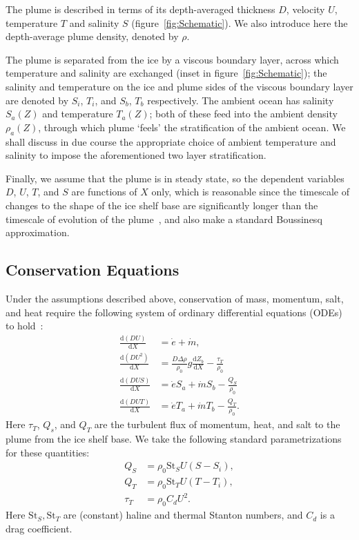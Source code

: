 \documentclass{jfm}
\newcommand{\dd}[2]{\frac{\mathrm{d} #1}{\mathrm{d} #2}}
\begin{document}
The plume is described in terms of its depth-averaged thickness $D$, velocity $U$, temperature $T$ and salinity $S$ (figure~\ref{fig:Schematic}). We also introduce here the depth-average plume density, denoted by $\rho$.

The plume is separated from the ice by a viscous boundary layer, across which temperature and salinity are exchanged (inset in figure~\ref{fig:Schematic}); the salinity and temperature on the ice and plume sides of the viscous boundary layer are denoted by $S_i$, $T_i$, and $S_b$, $T_b$ respectively. The ambient ocean has salinity $S_a(Z)$ and temperature $T_a(Z)$; both of these feed into the ambient density $\rho_a(Z)$, through which plume `feels' the stratification of the ambient ocean.  We shall discuss in due course the appropriate choice of ambient temperature and salinity to impose the aforementioned two layer stratification. 

Finally, we assume that the plume is in steady state, so the dependent variables $D$, $U$, $T$, and $S$ are functions of $X$ only, which is reasonable since the timescale of changes to the shape of the ice shelf base are significantly longer than the timescale of evolution of the plume~\citep{Hewitt2020AnnRevFlu}, and also make a standard Boussinesq approximation.

\subsection{Conservation Equations} 
Under the assumptions described above, conservation of mass, momentum, salt, and heat require the following system of ordinary differential equations (ODEs) to hold~\citep{Jenkins2011JPhysOcean,Magorrian2016JGeoResOcean}:
\begin{align}
\dd{(DU)}{X} &= \dot{e} + \dot{m},\label{E:Modelling:Model:RawMass}\\
\dd{(DU^2)}{X} &= \frac{D\Delta \rho}{\rho_0} g \dd{Z_b}{X}  -\frac{\tau_T}{\rho_0}\label{E:Modelling:Model:RawMometum}\\
\dd{(DUS)}{X} &= \dot{e}S_a + \dot{m}S_b -\frac{Q_S}{\rho_0}\label{E:Modelling:Model:RawSalt}\\
\dd{(DUT)}{X} &= \dot{e}T_a + \dot{m}T_b -\frac{Q_T}{\rho_0}.\label{E:Modelling:Model:RawTemp}
\end{align}
Here $\tau_T$, $Q_s$, and $Q_T$ are the turbulent flux of momentum, heat, and salt to the plume from the ice shelf base. We take the following standard parametrizations for these quantities:
\begin{align}
Q_S &= \rho_0 \mathrm{St}_S U (S - S_i),\label{E:Modelling:Model:TurbulentSalt} \\
Q_T &= \rho_0 \mathrm{St}_T U (T -T_i),\label{E:Modelling:Model:TurbulentHeat}\\
 \tau_T &= \rho_0 C_d U^2.\label{E:Modelling:Model:TurbulentShear}
\end{align}
Here $\mathrm{St}_S, \mathrm{St}_T$ are (constant) haline and thermal Stanton numbers, and $C_d$ is a drag coefficient. 
\end{document}
